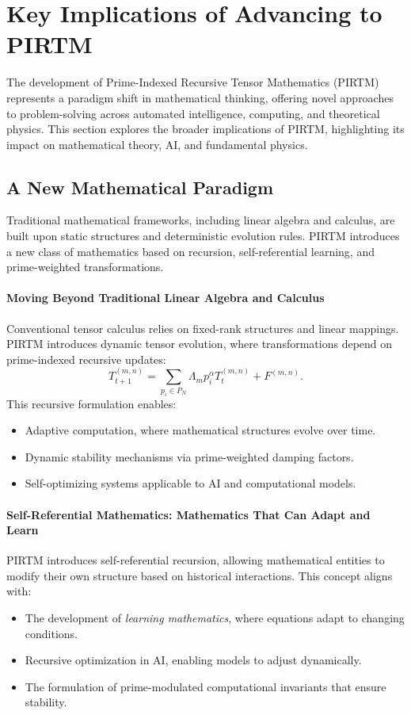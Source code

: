 \documentclass{article}
\theoremstyle{plain}
\begin{document}
\section{Key Implications of Advancing to PIRTM}

The development of Prime-Indexed Recursive Tensor Mathematics (PIRTM) represents a paradigm shift in mathematical thinking, offering novel approaches to problem-solving across automated intelligence, computing, and theoretical physics. This section explores the broader implications of PIRTM, highlighting its impact on mathematical theory, AI, and fundamental physics.

\subsection{A New Mathematical Paradigm}

Traditional mathematical frameworks, including linear algebra and calculus, are built upon static structures and deterministic evolution rules. PIRTM introduces a new class of mathematics based on recursion, self-referential learning, and prime-weighted transformations.

\paragraph{Moving Beyond Traditional Linear Algebra and Calculus}
Conventional tensor calculus relies on fixed-rank structures and linear mappings. PIRTM introduces dynamic tensor evolution, where transformations depend on prime-indexed recursive updates:
\begin{equation}
    T_{t+1}^{(m,n)} = \sum_{p_i \in P_N} \Lambda_m p_i^\alpha T_t^{(m,n)} + F^{(m,n)}.
\end{equation}
This recursive formulation enables:
\begin{itemize}
    \item Adaptive computation, where mathematical structures evolve over time.
    \item Dynamic stability mechanisms via prime-weighted damping factors.
    \item Self-optimizing systems applicable to AI and computational models.
\end{itemize}

\paragraph{Self-Referential Mathematics: Mathematics That Can Adapt and Learn}
PIRTM introduces self-referential recursion, allowing mathematical entities to modify their own structure based on historical interactions. This concept aligns with:
\begin{itemize}
    \item The development of \textit{learning mathematics}, where equations adapt to changing conditions.
    \item Recursive optimization in AI, enabling models to adjust dynamically.
    \item The formulation of prime-modulated computational invariants that ensure stability.
\end{itemize}
\end{document}
